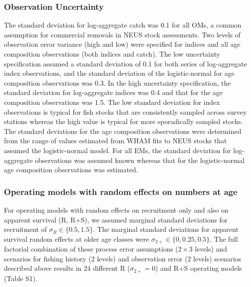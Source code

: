\documentclass[
  12pt,
]{article}
\begin{document}
\subsubsection*{Observation Uncertainty}\label{observation-uncertainty}

The standard deviation for log-aggregate catch was 0.1 for all OMs, a
common assumption for commercial removals in NEUS stock assessments. Two
levels of observation error variance (high and low) were specified for
indices and all age composition observations (both indices and catch).
The low uncertainty specification assumed a standard deviation of 0.1
for both series of log-aggregate index observations, and the standard
deviation of the logistic-normal for age composition observations was
0.3. In the high uncertainty specification, the standard deviation for
log-aggregate indices was 0.4 and that for the age composition
observations was 1.5. The low standard deviation for index observations
is typical for fish stocks that are consistently sampled across survey
stations whereas the high value is typical for more sporadically sampled
stocks. The standard deviations for the age composition observations
were determined from the range of values estimated from WHAM fits to
NEUS stocks that assumed the logistic-normal model. For all EMs, the
standard deviation for log-aggregate observations was assumed known
whereas that for the logistic-normal age composition observations was
estimated.

\subsubsection*{Operating models with random effects on numbers at
age}\label{operating-models-with-random-effects-on-numbers-at-age}

For operating models with random effects on recruitment only and also on
apparent survival (R, R+S), we assumed marginal standard deviations for
recruitment of \(\sigma_R \in \{0.5,1.5\}\). The marginal standard
deviations for apparent survival random effects at older age classes
were \(\sigma_{2+} \in \{0,0.25, 0.5\}\). The full factorial combination
of these process error assumptions (\(2\times 3\) levels) and scenarios
for fishing history (2 levels) and observation error (2 levels)
scenarios described above results in 24 different R
(\(\sigma_{2+} = 0\)) and R+S operating models (Table S1).
\end{document}

